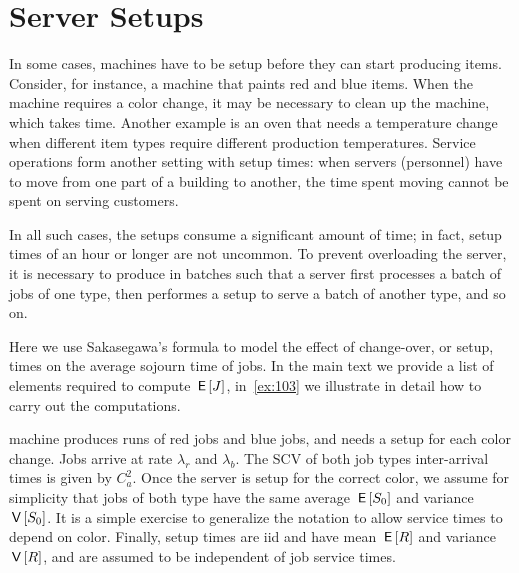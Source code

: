 \documentclass[queueing-book.tex]{subfiles}
\begin{document}
\section{Server Setups}
\label{sec:setups-batch-proc}

In some cases, machines have to be setup before they can start producing items.
Consider, for instance, a machine that paints red and blue items.
When the machine requires a color change, it may be necessary to clean up the machine, which takes time.
Another example is an oven that needs a temperature change when different item types require different production temperatures.
Service operations form another setting with setup times: when servers (personnel) have to move from one part of a building to another, the time spent moving cannot be spent on serving customers.


In all such cases, the setups consume a significant amount of time; in fact, setup times of an hour or longer are not uncommon.
To prevent overloading the server, it is necessary to produce in batches such that a server first processes a batch of jobs of one type, then performes a setup to serve a batch of another type, and so on.

Here we use Sakasegawa's formula to model the effect of change-over, or setup, times on the average sojourn time of jobs.
In the main text we provide a list of elements required to compute $\,\mathsf{E}\left[J\right]$, in~\cref{ex:103} we illustrate in detail how to carry out the computations.

 machine produces runs of red jobs and blue jobs, and needs a setup for each color change.
Jobs arrive at rate $\lambda_r$ and $\lambda_b$.
The SCV of both job types inter-arrival times is given by $C_a^2$.
Once the server is setup for the correct color, we assume for simplicity that jobs of both type have the same average  $\,\mathsf{E}\left[S_0\right]$ and variance $\,\mathsf{V}\left[S_0\right]$.
It is a simple exercise to generalize the notation to allow service times to depend on color.
Finally, setup times are iid and have mean $\,\mathsf{E}\left[R\right]$ and variance $\,\mathsf{V}\left[R\right]$, and are assumed to be independent of job service times.
\end{document}
